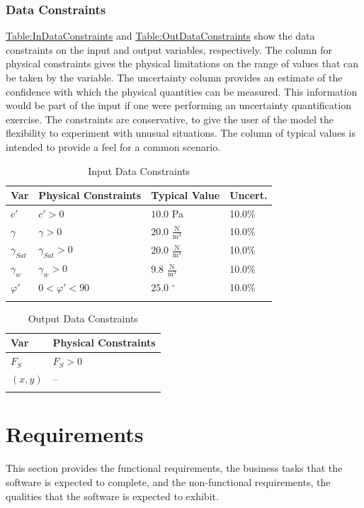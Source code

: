 \documentclass[12pt]{article}
\begin{document}
\subsubsection{Data Constraints}
\label{Sec:DataConstraints}
\hyperref[Table:InDataConstraints]{Table:InDataConstraints} and \hyperref[Table:OutDataConstraints]{Table:OutDataConstraints} show the data constraints on the input and output variables, respectively. The column for physical constraints gives the physical limitations on the range of values that can be taken by the variable. The uncertainty column provides an estimate of the confidence with which the physical quantities can be measured. This information would be part of the input if one were performing an uncertainty quantification exercise. The constraints are conservative, to give the user of the model the flexibility to experiment with unusual situations. The column of typical values is intended to provide a feel for a common scenario.
\begin{longtable}{l l l l}
\toprule
Var & Physical Constraints & Typical Value & Uncert.
\\
\midrule
\endhead
$c'$ & $c'>0$ & $10.0$ Pa & 10.0$\%$
\\
$γ$ & $γ>0$ & $20.0$ $\frac{\text{N}}{\text{m}^{3}}$ & 10.0$\%$
\\
${γ_{Sat}}$ & ${γ_{Sat}}>0$ & $20.0$ $\frac{\text{N}}{\text{m}^{3}}$ & 10.0$\%$
\\
${γ_{w}}$ & ${γ_{w}}>0$ & $9.8$ $\frac{\text{N}}{\text{m}^{3}}$ & 10.0$\%$
\\
$φ'$ & $0<φ'<90$ & $25.0$ ${}^{\circ}$ & 10.0$\%$
\\
\bottomrule
\caption{Input Data Constraints}
\label{Table:InDataConstraints}
\end{longtable}
\begin{longtable}{l l}
\toprule
Var & Physical Constraints
\\
\midrule
\endhead
${F_{S}}$ & ${F_{S}}>0$
\\
$(x,y)$ & --
\\
\bottomrule
\caption{Output Data Constraints}
\label{Table:OutDataConstraints}
\end{longtable}
\section{Requirements}
\label{Sec:Requirements}
This section provides the functional requirements, the business tasks that the software is expected to complete, and the non-functional requirements, the qualities that the software is expected to exhibit.
\end{document}
